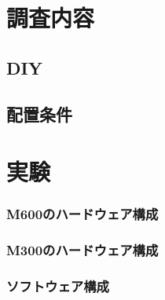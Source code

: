 \documentclass[a4j,fleqn,dvipdfmx,uplatex]{jsarticle}
\begin{document}


\section{調査内容}\label{sec2}

\subsection{DIY}\label{subsec:apriltag}

\subsection{配置条件}\label{subsec:tag_pos}



\section{実験}\label{sec3}

\subsubsection{M600のハードウェア構成}\label{subsubsec:m600}


\subsubsection{M300のハードウェア構成} 


\subsubsection{ソフトウェア構成}
\end{document}
